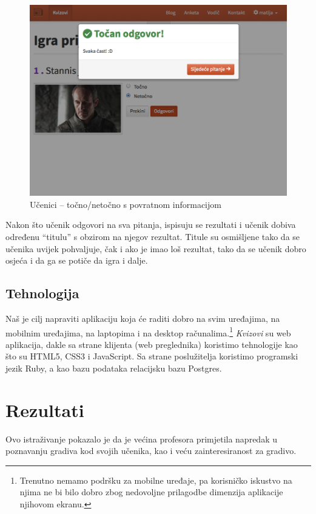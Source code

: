 \documentclass{scrreprt}
\begin{document}
\begin{figure}[H]
  \includegraphics[width=\textwidth, clip=true, trim=0 7cm 0 0, fbox]{student/boolean_question_correct}
  \caption{Učenici -- točno/netočno s povratnom informacijom}
\end{figure}

Nakon što učenik odgovori na sva pitanja, ispisuju se rezultati i učenik dobiva
određenu ``titulu'' s obzirom na njegov rezultat. Titule su osmišljene tako da
se učenika uvijek pohvaljuje, čak i ako je imao loš rezultat, tako da se učenik
dobro osjeća i da ga se potiče da igra i dalje.

\section{Tehnologija}

Naš je cilj napraviti aplikaciju koja će raditi dobro na svim uređajima, na
mobilnim uređajima, na laptopima i na desktop računalima.\footnote{Trenutno
nemamo podršku za mobilne uređaje, pa korisničko iskustvo na njima ne bi bilo
dobro zbog nedovoljne prilagodbe dimenzija aplikacije njihovom ekranu.}
\emph{Kvizovi} su web aplikacija, dakle sa strane klijenta (web preglednika)
koristimo tehnologije kao što su HTML5, CSS3 i JavaScript. Sa strane
poslužitelja koristimo programski jezik Ruby, a kao bazu podataka relacijsku
bazu Postgres.

\chapter{Rezultati}

Ovo istraživanje pokazalo je da je većina profesora primjetila napredak u
poznavanju gradiva kod svojih učenika, kao i veću zainteresiranost za gradivo.
\end{document}
